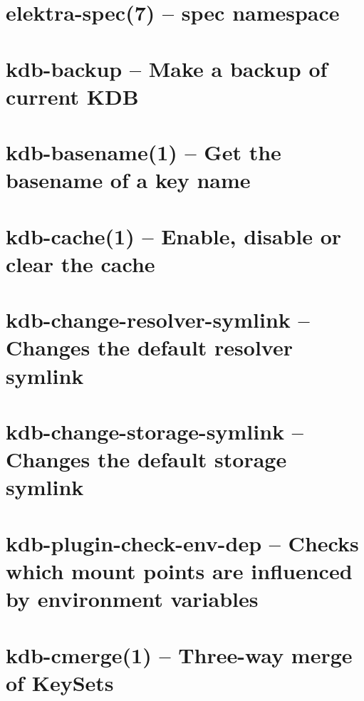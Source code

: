 \let\mypdfximage\pdfximage\def\pdfximage{\immediate\mypdfximage}\documentclass[twoside]{book}
\newcommand{\+}{\discretionary{\mbox{\scriptsize$\hookleftarrow$}}{}{}}
\begin{document}
\chapter{elektra-\/spec(7) -- spec namespace}
\label{doc_help_elektra-spec_md}

\chapter{kdb-\/backup -- Make a backup of current KDB}
\label{doc_help_kdb-backup_md}

\chapter{kdb-\/basename(1) -- Get the basename of a key name}
\label{doc_help_kdb-basename_md}

\chapter{kdb-\/cache(1) -- Enable, disable or clear the cache}
\label{doc_help_kdb-cache_md}

\chapter{kdb-\/change-\/resolver-\/symlink -- Changes the default resolver symlink}
\label{doc_help_kdb-change-resolver-symlink_md}

\chapter{kdb-\/change-\/storage-\/symlink -- Changes the default storage symlink}
\label{doc_help_kdb-change-storage-symlink_md}

\chapter{kdb-\/plugin-\/check-\/env-\/dep -- Checks which mount points are influenced by environment variables}
\label{doc_help_kdb-check-env-dep_md}

\chapter{kdb-\/cmerge(1) -- Three-\/way merge of Key\+Sets}
\label{doc_help_kdb-cmerge_md}

\end{document}
